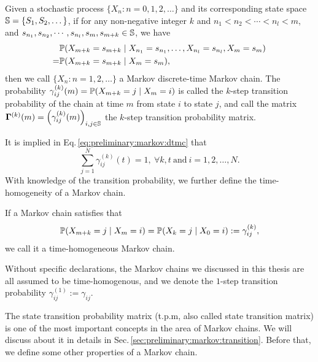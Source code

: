 		\begin{defn}
		\label{defn:markov}
		Given a stochastic process $\{X_n \colon n=0,1,2,\dots\}$
		and its corresponding state space ${\mathbb S} = \{S_1,S_2,\dots\}$,
		if for any non-negative integer $k$ and $n_1 < n_2 < \cdots < n_l < m$,
		and $s_{n_1},s_{n_2},\cdots,s_{n_l},s_{m},s_{m+k} \in {\mathbb S}$, we have
			\begin{equation}
			\label{eq:preliminary:markov:dtmc}
			\begin{aligned}
			& \mathbb{P}(X_{m+k} = s_{m+k} \mid X_{n_1} = s_{n_1},\dots,X_{n_l} = s_{n_l},X_{m} = s_{m}) \\
			= & \mathbb{P}(X_{m+k} = s_{m+k} \mid X_{m} = s_{m}),
			\end{aligned}
			\end{equation}
		then we call $\{X_n \colon n=1,2,\dots\}$ a Markov discrete-time Markov chain.
		The probability $\gamma_{ij}^{(k)}(m) = \mathbb{P}(X_{m+k} = j \mid X_{m} = i)$ 
		is called the $k$-step transition probability 
		of the chain at time $m$ from state $i$ to state $j$, 
		and call the matrix 
		${\boldsymbol\Gamma}^{(k)}(m) = \left(\gamma_{ij}^{(k)}(m) \right)_{i,j \in {\mathbb S}}$
		the $k$-step transition probability matrix.
		\end{defn}
It is implied in Eq.\,\ref{eq:preliminary:markov:dtmc} that 
		\begin{equation}
		\sum_{j=1}^{N} \gamma_{ij}^{(k)}(t) = 1,\ \forall k,t\ \text{and}\ i=1,2,\dots,N.
		\end{equation}
With knowledge of the transition probability, 
we further define the time-homogeneity of a Markov chain.
		
		\begin{defn}
		\label{defn:markov:homogeneity}
		If a Markov chain satisfies that
			\begin{equation}
			\label{eq:preliminary:markov:homo}
			\mathbb{P}(X_{m+k} = j \mid X_{m} = i) = \mathbb{P}(X_{k} = j \mid X_{0} = i) := \gamma_{ij}^{(k)},
			\end{equation}
		we call it a time-homogeneous Markov chain.
		\end{defn}
Without specific declarations, 
the Markov chains we discussed in this thesis are all assumed to be time-homogenous,
and we denote the $1$-step transition probability $\gamma_{ij}^{(1)} := \gamma_{ij}$.

The state transition probability matrix (t.p.m, also called state transition matrix)
is one of the most important concepts in the area of Markov chains.
We will discuss about it in details in Sec.\,\ref{sec:preliminary:markov:transition}.
Before that, we define some other properties of a Markov chain.


